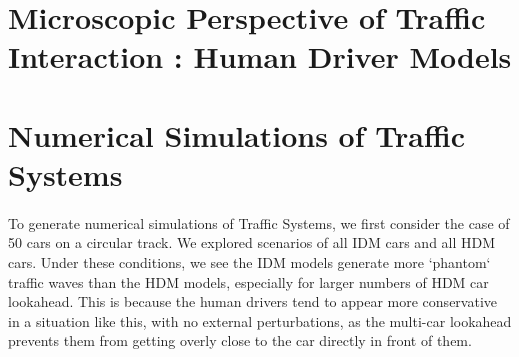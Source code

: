 \documentclass[12pt]{article}
\begin{document}
%
%
%
%
%

\section{Microscopic Perspective of Traffic Interaction : Human Driver Models}

\section{Numerical Simulations of Traffic Systems}

\paragraph{}To generate numerical simulations of Traffic Systems, we first consider the case of 50 cars on a circular track. We explored scenarios of all IDM cars and all HDM cars. Under these conditions, we see the IDM models generate more `phantom` traffic waves than the HDM models, especially for larger numbers of HDM car lookahead. This is because the human drivers tend to appear more conservative in a situation like this, with no external perturbations, as the multi-car lookahead prevents them from getting overly close to the car directly in front of them.
\end{document}
